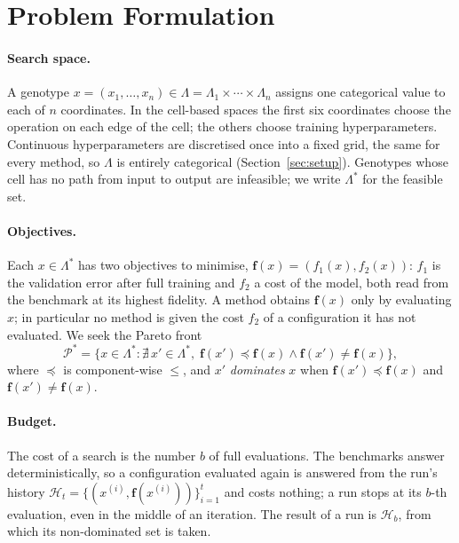 \section{Problem Formulation}
\label{sec:problem-formulation}

\paragraph{Search space.} A genotype $x = (x_1, \dots, x_n) \in \Lambda = \Lambda_1 \times \cdots \times \Lambda_n$
assigns one categorical value to each of $n$ coordinates. In the cell-based spaces the first six coordinates choose
the operation on each edge of the cell; the others choose training hyperparameters. Continuous hyperparameters are
discretised once into a fixed grid, the same for every method, so $\Lambda$ is entirely categorical
(Section~\ref{sec:setup}). Genotypes whose cell has no path from input to output are infeasible; we write
$\Lambda^*$ for the feasible set.

\paragraph{Objectives.} Each $x \in \Lambda^*$ has two objectives to minimise, $\mathbf{f}(x) = (f_1(x), f_2(x))$:
$f_1$ is the validation error after full training and $f_2$ a cost of the model, both read from the benchmark at its
highest fidelity. A method obtains $\mathbf{f}(x)$ only by evaluating $x$; in particular no method is given the cost
$f_2$ of a configuration it has not evaluated. We seek the Pareto front
\[
    \mathcal{P}^* = \bigl\{ x \in \Lambda^* : \nexists\, x' \in \Lambda^*,\;
    \mathbf{f}(x') \preceq \mathbf{f}(x) \wedge \mathbf{f}(x') \neq \mathbf{f}(x) \bigr\},
\]
where $\preceq$ is component-wise $\leq$, and $x'$ \emph{dominates} $x$ when $\mathbf{f}(x') \preceq \mathbf{f}(x)$
and $\mathbf{f}(x') \neq \mathbf{f}(x)$.

\paragraph{Budget.} The cost of a search is the number $b$ of full evaluations. The benchmarks answer
deterministically, so a configuration evaluated again is answered from the run's history
$\mathcal{H}_t = \{(x^{(i)}, \mathbf{f}(x^{(i)}))\}_{i=1}^{t}$ and costs nothing; a run stops at its $b$-th evaluation,
even in the middle of an iteration. The result of a run is $\mathcal{H}_b$, from which its non-dominated set is taken.
